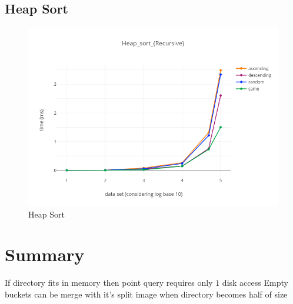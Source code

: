 \documentclass[paper=letter, fontsize=12pt]{article}
\begin{document}
\subsection{Heap Sort}
\begin{figure}[H]
	\centering
	\includegraphics[scale=0.75]{../analysis/Heap_sort_(Recursive).png}
	\caption{Heap Sort}
\end{figure}
%
%

\section{Summary}
\begin{itemize}
	\tick If directory fits in memory then point query requires only $ 1 $ disk access
	\tick Empty buckets can be merge with it's split image when directory becomes half of size
\end{itemize}
\end{document}
